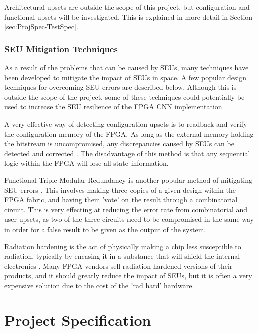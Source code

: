 \documentclass[12pt]{article}
\begin{document}
Architectural upsets are outside the scope of this project, but configuration and functional upsets will be investigated. This is explained in more detail in Section \ref{sec:ProjSpec-TestSpec}.

\subsubsection{SEU Mitigation Techniques}
\label{sec:Background-FPGAsAndSpaceApplications-Mitigation}
\vspace{-12pt}

As a result of the problems that can be caused by SEUs, many techniques have been developed to mitigate the impact of SEUs in space. A few popular design techniques for overcoming SEU errors are described below. Although this is outside the scope of the project, some of these techniques could potentially be used to increase the SEU resilience of the FPGA CNN implementation.

A very effective way of detecting configuration upsets is to readback and verify the configuration memory of the FPGA. As long as the external memory holding the bitstream is uncompromised, any discrepancies caused by SEUs can be detected and corrected \cite{SuitabilityGaisler}. The disadvantage of this method is that any sequential logic within the FPGA will lose all state information.

Functional Triple Modular Redundancy is another popular method of mitigating SEU errors \cite{FTripleMR}. This involves making three copies of a given design within the FPGA fabric, and having them 'vote' on the result through a combinatorial circuit. This is very effecting at reducing the error rate from combinatorial and user upsets, as two of the three circuits need to be compromised in the same way in order for a false result to be given as the output of the system.

Radiation hardening is the act of physically making a chip less susceptible to radiation, typically by encasing it in a substance that will shield the internal electronics \cite{RadHardFpga}. Many FPGA vendors sell radiation hardened versions of their products, and it should greatly reduce the impact of SEUs, but it is often a very expensive solution due to the cost of the 'rad hard' hardware.

\newpage

\section{Project Specification}
\label{sec:ProjSpec}
\vspace{-12pt}
\end{document}
